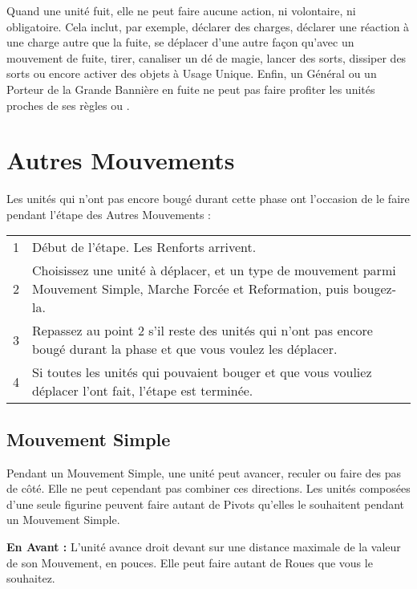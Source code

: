 Quand une unité fuit, elle ne peut faire aucune action, ni volontaire, ni obligatoire. Cela inclut, par exemple, déclarer des charges, déclarer une réaction à une charge autre que la fuite, se déplacer d'une autre façon qu'avec un mouvement de fuite, tirer, canaliser un dé de magie, lancer des sorts, dissiper des sorts ou encore activer des objets à Usage Unique. Enfin, un Général ou un Porteur de la Grande Bannière en fuite ne peut pas faire profiter les unités proches de ses règles \inspiringpresence{} ou \holdyourground{}.

\newpage
\section{Autres Mouvements}

Les unités qui n'ont pas encore bougé durant cette phase ont l'occasion de le faire pendant l'étape des Autres Mouvements :

\hspace*{0.3cm}
\begin{tabular}{c|m{12cm}}
1 & Début de l'étape. Les Renforts arrivent.\tabularnewline
2 & Choisissez une unité à déplacer, et un type de mouvement parmi Mouvement Simple, Marche Forcée et Reformation, puis bougez-la.\tabularnewline
3 & Repassez au point 2 s'il reste des unités qui n'ont pas encore bougé durant la phase et que vous voulez les déplacer.\tabularnewline
4 & Si toutes les unités qui pouvaient bouger et que vous vouliez déplacer l'ont fait, l'étape est terminée.\tabularnewline
\end{tabular}

\subsection{Mouvement Simple}

Pendant un Mouvement Simple, une unité peut avancer, reculer ou faire des pas de côté. Elle ne peut cependant pas combiner ces directions. Les unités composées d'une seule figurine peuvent faire autant de Pivots qu'elles le souhaitent pendant un Mouvement Simple. 

\noindent\textbf{En Avant :} L'unité avance droit devant sur une distance maximale de la valeur de son Mouvement, en pouces. Elle peut faire autant de Roues que vous le souhaitez.

